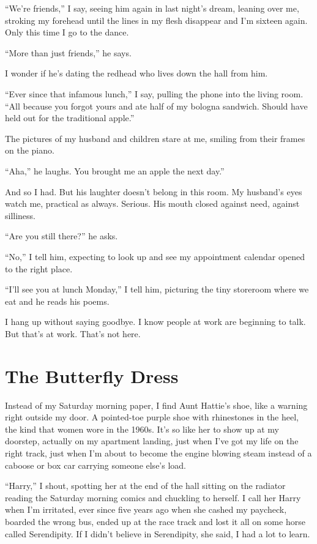 \documentclass[twoside,10pt]{book}
\begin{document}
``We're friends,'' I say, seeing him again in last night's dream,
leaning over me, stroking my forehead until the lines in my flesh
disappear and I'm sixteen again. Only this time I go to the dance.

``More than just friends,'' he says.

I wonder if he's dating the redhead who lives down the hall from him.

``Ever since that infamous lunch,'' I say, pulling the phone into the
living room. ``All because you forgot yours and ate half of my bologna
sandwich. Should have held out for the traditional apple.''

The pictures of my husband and children stare at me, smiling from their
frames on the piano.

``Aha,'' he laughs. You brought me an apple the next day.''

And so I had. But his laughter doesn't belong in this room. My husband's
eyes watch me, prac­tical as always. Serious. His mouth closed against
need, against silliness.

``Are you still there?'' he asks.

``No,'' I tell him, expecting to look up and see my appointment calendar
opened to the right place.

``I'll see you at lunch Monday,'' I tell him, picturing the tiny
storeroom where we eat and he reads his poems.

I hang up without saying goodbye. I know people at work are beginning to
talk. But that's at work. That's not here.


\cleardoublepage
\chapter{The Butterfly Dress}

Instead of my Saturday morning paper, I find Aunt Hattie's shoe, like a
warning right outside my door. A pointed-toe purple shoe with
rhinestones in the heel, the kind that women wore in the 1960s. It's so
like her to show up at my doorstep, actually on my apartment landing,
just when I've got my life on the right track, just when I'm about to
become the engine blowing steam instead of a caboose or box car carrying
someone else's load.

``Harry,'' I shout, spotting her at the end of the hall sitting on the
radiator reading the Saturday morning comics and chuckling to herself. I
call her Harry when I'm irritated, ever since five years ago when she
cashed my paycheck, boarded the wrong bus, ended up at the race track
and lost it all on some horse called Serendipity. If I didn't believe in
Serendipity, she said, I had a lot to learn.
\end{document}
